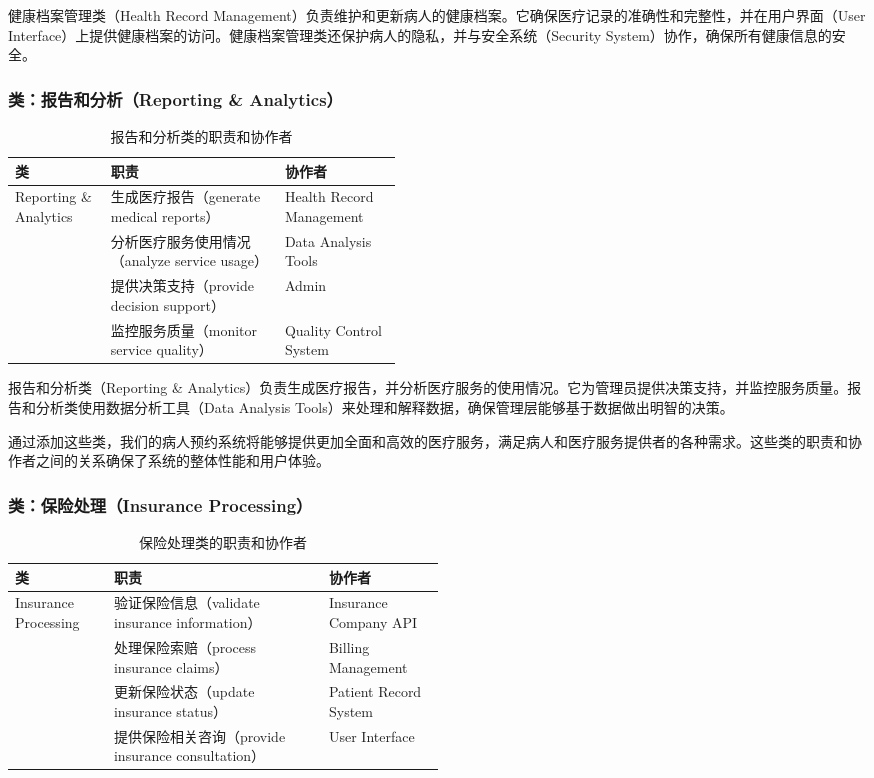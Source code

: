 健康档案管理类（Health Record Management）负责维护和更新病人的健康档案。它确保医疗记录的准确性和完整性，并在用户界面（User Interface）上提供健康档案的访问。健康档案管理类还保护病人的隐私，并与安全系统（Security System）协作，确保所有健康信息的安全。

\subsubsection{类：报告和分析（Reporting \& Analytics）}
\begin{table}[htbp]
	\centering
	\begin{tabular}{|l|p{0.45\linewidth}|l|}
		\hline
		\textbf{类} & \textbf{职责} & \textbf{协作者} \\
		\hline
		Reporting \& Analytics & 生成医疗报告（generate medical reports） & Health Record Management \\
		& 分析医疗服务使用情况（analyze service usage） & Data Analysis Tools \\
		& 提供决策支持（provide decision support） & Admin \\
		& 监控服务质量（monitor service quality） & Quality Control System \\
		\hline
	\end{tabular}
	\caption{报告和分析类的职责和协作者}
	\label{tab:reporting_analytics}
\end{table}

报告和分析类（Reporting \& Analytics）负责生成医疗报告，并分析医疗服务的使用情况。它为管理员提供决策支持，并监控服务质量。报告和分析类使用数据分析工具（Data Analysis Tools）来处理和解释数据，确保管理层能够基于数据做出明智的决策。

通过添加这些类，我们的病人预约系统将能够提供更加全面和高效的医疗服务，满足病人和医疗服务提供者的各种需求。这些类的职责和协作者之间的关系确保了系统的整体性能和用户体验。

\subsubsection{类：保险处理（Insurance Processing）}
\begin{table}[htbp]
	\centering
	\begin{tabular}{|l|p{0.5\linewidth}|l|}
		\hline
		\textbf{类} & \textbf{职责} & \textbf{协作者} \\
		\hline
		Insurance Processing & 验证保险信息（validate insurance information） & Insurance Company API \\
		& 处理保险索赔（process insurance claims） & Billing Management \\
		& 更新保险状态（update insurance status） & Patient Record System \\
		& 提供保险相关咨询（provide insurance consultation） & User Interface \\
		\hline
	\end{tabular}
	\caption{保险处理类的职责和协作者}
	\label{tab:insurance_processing}
\end{table}

